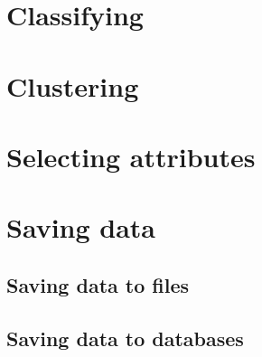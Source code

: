 \section{Classifying}

\section{Clustering}

\section{Selecting attributes}

\section{Saving data}

\subsection{Saving data to files}

\subsection{Saving data to databases}
